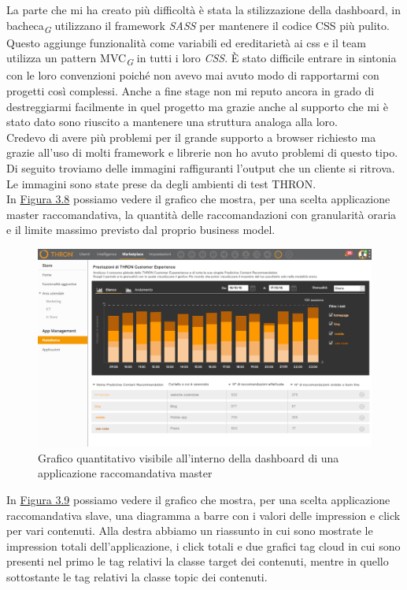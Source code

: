 \documentclass[a4paper, 12pt, twoside, openright]{book}
\newcommand{\gloss}[1]{#1\textsubscript{\textit{\tiny{G}}}}
\begin{document}
La parte che mi ha creato più difficoltà è stata la stilizzazione della dashboard, in \gloss{bacheca} utilizzano il framework \textit{SASS} per mantenere il codice CSS più pulito. Questo aggiunge funzionalità come variabili ed ereditarietà ai css e il team utilizza un pattern \gloss{MVC} in tutti i loro \textit{CSS}. \`{E} stato difficile entrare in sintonia con le loro convenzioni poiché non avevo mai avuto modo di rapportarmi con progetti così complessi. Anche a fine stage non mi reputo ancora in grado di destreggiarmi facilmente in quel progetto ma grazie anche al supporto che mi è stato dato sono riuscito a mantenere una struttura analoga alla loro.\\
Credevo di avere più problemi per il grande supporto a browser richiesto ma grazie all'uso di molti framework e librerie non ho avuto problemi di questo tipo.\\
Di seguito troviamo delle immagini raffiguranti l'output che un cliente si ritrova. Le immagini sono state prese da degli ambienti di test THRON.\\
In \hyperref[grafico-quantitativo]{Figura 3.8} possiamo vedere il grafico che mostra, per una scelta applicazione master raccomandativa, la quantità delle raccomandazioni con granularità oraria e il limite massimo previsto dal proprio business model. 
\begin{figure}[H]
	\centering
	\label{grafico-quantitativo}
	\includegraphics[width=1.0\textwidth]{images/grafico-quantitativo.jpg}
	\caption{Grafico quantitativo visibile all'interno della dashboard di una applicazione raccomandativa master}
\end{figure}
In \hyperref[grafico-qualitativo-1]{Figura 3.9} possiamo vedere il grafico che mostra, per una scelta applicazione raccomandativa slave, una diagramma a barre con i valori delle impression e click per vari contenuti. Alla destra abbiamo un riassunto in cui sono mostrate le impression totali dell'applicazione, i click totali e due grafici tag cloud in cui sono presenti nel primo le tag relativi la classe target dei contenuti, mentre in quello sottostante le tag relativi la classe topic dei contenuti. 
\end{document}
